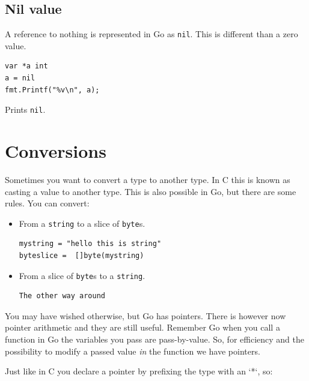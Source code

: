 \noindent{}
\subsection{Nil value}
A reference to nothing is represented in Go as \lstinline{nil}. This is
different than a zero value. 

\begin{lstlisting}
var *a int
a = nil
fmt.Printf("%v\n", a);
\end{lstlisting}
Prints \lstinline{nil}.

\section{Conversions}
\label{sec:conversions}
Sometimes you want to convert a type to another type. In C this is known
as casting a value to another type. This is also possible in Go, but
there are some rules.
You can convert:
\begin{itemize}
\item{
From a \lstinline{string} to a slice of \lstinline{byte}s.
\begin{lstlisting}
mystring = "hello this is string"
byteslice =  []byte(mystring)
\end{lstlisting}
}
\item{
From a slice of \lstinline{byte}s to a \lstinline{string}.
\begin{lstlisting}
The other way around
\end{lstlisting}
}
\end{itemize}














You may have wished otherwise, but Go has pointers.
There is however now pointer arithmetic and they are still useful.
Remember Go when you call a function in Go the variables you pass are
pass-by-value. So, for efficiency and the possibility to modify a
passed value \emph{in} the function we have pointers.

Just like in C you declare a pointer by prefixing the type with an `*`,
so:

